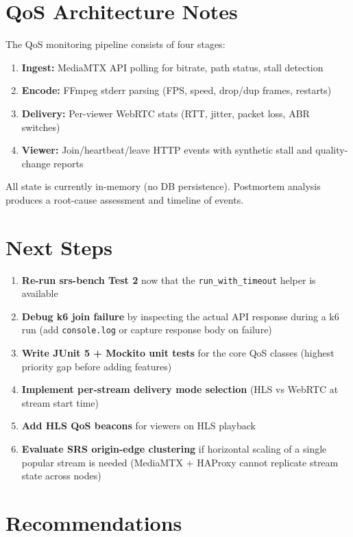 \documentclass[a4paper,11pt]{article}
\begin{document}
\section{QoS Architecture Notes}

The QoS monitoring pipeline consists of four stages:
\begin{enumerate}
  \item \textbf{Ingest:} MediaMTX API polling for bitrate, path status, stall detection
  \item \textbf{Encode:} FFmpeg stderr parsing (FPS, speed, drop/dup frames, restarts)
  \item \textbf{Delivery:} Per-viewer WebRTC stats (RTT, jitter, packet loss, ABR switches)
  \item \textbf{Viewer:} Join/heartbeat/leave HTTP events with synthetic stall and quality-change reports
\end{enumerate}

All state is currently in-memory (no DB persistence). Postmortem analysis produces a root-cause assessment and timeline of events.

\section{Next Steps}

\begin{enumerate}
  \item \textbf{Re-run srs-bench Test 2} now that the \texttt{run\_with\_timeout} helper is available
  \item \textbf{Debug k6 join failure} by inspecting the actual API response during a k6 run (add \texttt{console.log} or capture response body on failure)
  \item \textbf{Write JUnit 5 + Mockito unit tests} for the core QoS classes (highest priority gap before adding features)
  \item \textbf{Implement per-stream delivery mode selection} (HLS vs WebRTC at stream start time)
  \item \textbf{Add HLS QoS beacons} for viewers on HLS playback
  \item \textbf{Evaluate SRS origin-edge clustering} if horizontal scaling of a single popular stream is needed (MediaMTX + HAProxy cannot replicate stream state across nodes)
\end{enumerate}

\section{Recommendations}
\end{document}
